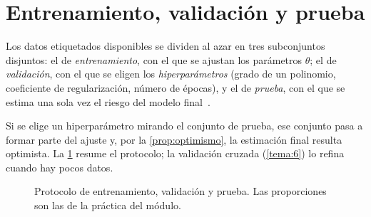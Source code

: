\section{Entrenamiento, validación y prueba}

\begin{definicion}
Los datos etiquetados disponibles se dividen al azar en tres subconjuntos disjuntos: el de \emph{entrenamiento}, con el que se ajustan los parámetros $\theta$; el de \emph{validación}, con el que se eligen los \emph{hiperparámetros} (grado de un polinomio, coeficiente de regularización, número de épocas), y el de \emph{prueba}, con el que se estima una sola vez el riesgo del modelo final~\cite[§2.8]{mit6390}.
\end{definicion}

Si se elige un hiperparámetro mirando el conjunto de prueba, ese conjunto pasa a formar parte del ajuste y, por la \cref{prop:optimismo}, la estimación final resulta optimista. La \cref{fig:particion} resume el protocolo; la validación cruzada (\cref{tema:6}) lo refina cuando hay pocos datos.

\begin{figure}[h]
\centering
{}
\caption{Protocolo de entrenamiento, validación y prueba. Las proporciones son las de la práctica del módulo.}
\label{fig:particion}
\end{figure}

